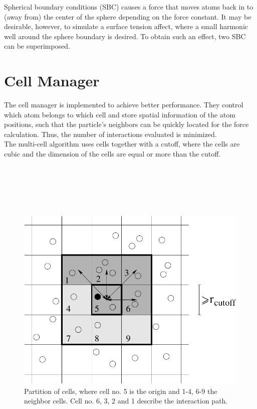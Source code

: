 \documentclass[11pt]{report}
\begin{document}
\begin{appendix}
Spherical boundary conditions (SBC) causes a force that moves atoms
back in to (away from) the center of the sphere depending on the force
constant. It may be desirable, however, to simulate a surface tension
affect, where a small harmonic well around the sphere boundary is
desired. To obtain such an effect, two SBC  can be superimposed.



\section{Cell Manager}
The cell manager is implemented to achieve better
performance. They control which atom belongs to which cell and store
spatial information of the atom positions, such that the particle's
neighbors can be quickly located for the force
calculation.  Thus, the number of interactions evaluated is
minimized.\\

The multi-cell algorithm uses cells together with a
cutoff, where the cells are cubic and the dimension of the cells are
equal or more than the cutoff. \\ \\ \\ \\ \\ \\
\begin{figure}[htb]
   \centerline{\includegraphics[width=12cm]{cell_algo_cell.pdf}}
    \caption{Partition of cells, where cell no. 5 is the
    origin and 1-4, 6-9 the neighbor cells. Cell no. 6, 3, 2 and 1
    describe the interaction path.\label{fig:cell_algo_cell}}
\end{figure}


\end{appendix}
\end{document}
